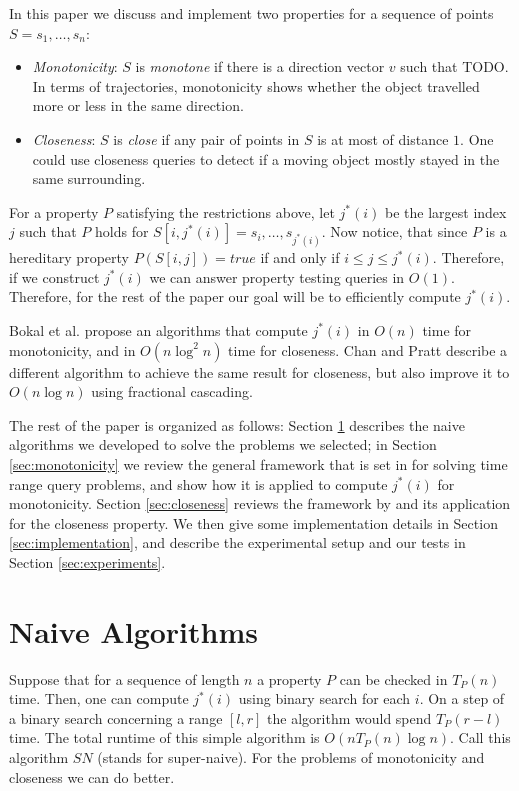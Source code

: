\documentclass{article}
\begin{document}
In this paper we discuss and implement two properties for a sequence of points $S = s_1, \dots, s_n$:
\begin{itemize}
    \item \textit{Monotonicity}:  $S$ is \textit{monotone} if there is a direction vector $v$ such that TODO. In terms of trajectories, monotonicity shows whether the object travelled more or less in the same direction.
    
    \item \textit{Closeness}: $S$ is \textit{close} if any pair of points in $S$ is at most of distance $1$. One could use closeness queries to detect if a moving object mostly stayed in the same surrounding.
\end{itemize}

For a property $P$ satisfying the restrictions above, let $j^*(i)$ be the largest index $j$ such that $P$ holds for $S[i, j^*(i)] = s_i, \dots, s_{j^*(i)}$. Now notice, that since $P$ is a hereditary property $P(S[i, j]) = true$ if and only if $i \leq j \leq j^*(i)$. Therefore, if we construct $j^*(i)$ we can answer property testing queries in $O(1)$. Therefore, for the rest of the paper our goal will be to efficiently compute $j^*(i)$.

Bokal et al. \cite{bokal2015} propose an algorithms that compute $j^*(i)$ in $O(n)$ time for monotonicity, and in $O(n\log^2 n)$ time for closeness. Chan and Pratt \cite{chan2016} describe a different algorithm to achieve the same result for closeness, but also improve it to $O(n\log n)$ using fractional cascading.

The rest of the paper is organized as follows: Section \ref{sec:naive}
describes the naive algorithms we developed to solve the problems
we selected; in Section \ref{sec:monotonicity} we review the general
framework that is set in \cite{bokal2015} for solving time range
query problems, and show how it is applied to compute $j^*(i)$ for
monotonicity. Section \ref{sec:closeness} reviews the framework by
\cite{chan2016} and its application for the closeness property. We
then give some implementation details in Section \ref{sec:implementation},
and describe the experimental setup and our tests in Section
\ref{sec:experiments}.

\section{Naive Algorithms}
\label{sec:naive}
Suppose that for a sequence of length $n$ a property $P$ can be checked in $T_P(n)$ time. Then, one can compute $j^*(i)$ using binary search for each $i$. On a step of a binary search concerning a range $[l, r]$ the algorithm would spend $T_P(r - l)$ time. The total runtime of this simple algorithm is $O(nT_P(n)\log n)$. Call this algorithm $SN$ (stands for super-naive). For the problems of monotonicity and closeness we can do better.
\end{document}
